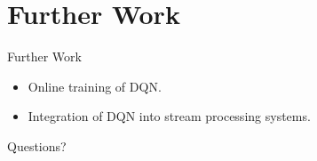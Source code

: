 \section{Further Work}
\frame{\sectionpage}

\begin{frame}{Further Work}
    \begin{itemize}
        \item Online training of DQN.
        \item Integration of DQN into stream processing systems.
    \end{itemize}
\end{frame}

\begin{frame}{}
    \begin{center}
        Questions?
    \end{center}
\end{frame}
